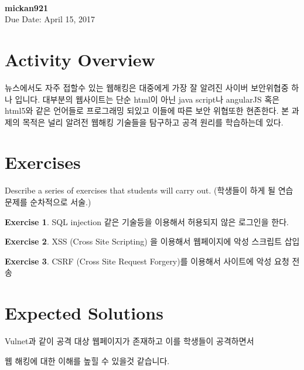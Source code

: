 \documentclass[a4paper, 11pt]{article}
\theoremstyle{definition}
\newtheorem{exercise}{Exercise}
\begin{document}
 \\
         {\phantom{} \hfill \textbf{mickan921}} \\
         {\phantom{} \hfill Due Date: April 15, 2017} \\

\section{Activity Overview}

뉴스에서도 자주 접할수 있는 웹해킹은 대중에게 가장 잘 알려진  사이버 보안위협중 하나 입니다. 대부분의 웹사이트는 단순 html이 아닌 java script나 angularJS 혹은 html5와 같은 언어들로 프로그래밍 되있고 이들에 따른 보안 위협또한 현존한다. 본 과제의 목적은 널리 알려전 웹해킹 기술들을 탐구하고 공격 원리를 학습하는데 있다.

\section{Exercises}

Describe a series of exercises that students will carry out. (학생들이 하게
될 연습문제를 순차적으로 서술.)

\begin{exercise}

  SQL injection 같은 기술등을 이용해서 허용되지 않은 로그인을 한다.

\end{exercise}

\begin{exercise}

  XSS (Cross Site Scripting) 을 이용해서 웹페이지에 악성 스크립트 삽입

\end{exercise}

\begin{exercise}

  CSRF (Cross Site Request Forgery)를 이용해서 사이트에 악성 요청 전송

\end{exercise}

\section{Expected Solutions}

Vulnet과 같이 공격 대상 웹페이지가 존재하고 이를 학생들이 공격하면서

웹 해킹에 대한 이해를 높힐 수 있을것 같습니다.



\end{document}
